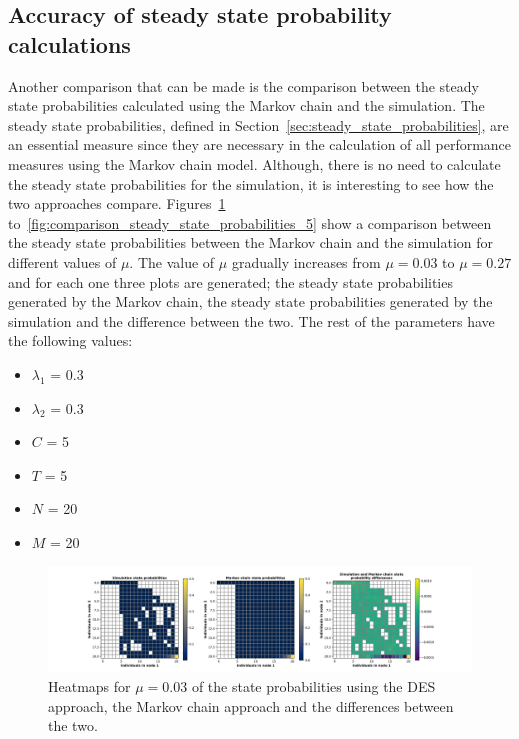 \subsection{Accuracy of steady state probability calculations}

Another comparison that can be made is the comparison between the steady state
probabilities calculated using the Markov chain and the simulation.
The steady state probabilities, defined in
Section~\ref{sec:steady_state_probabilities}, are an essential measure since
they are necessary in the calculation of all performance measures using the
Markov chain model.
Although, there is no need to calculate the steady state probabilities for the
simulation, it is interesting to see how the two approaches compare.
Figures~\ref{fig:comparison_steady_state_probabilities_1}
to~\ref{fig:comparison_steady_state_probabilities_5} show a comparison between
the steady state probabilities between the Markov chain and the simulation
for different values of \(\mu\).
The value of \(\mu\) gradually increases from \(\mu = 0.03\) to \(\mu = 0.27\)
and for each one three plots are generated; the steady state probabilities
generated by the Markov chain, the steady state probabilities generated by the
simulation and the difference between the two.
The rest of the parameters have the following values:

\begin{multicols}{2}
    \begin{itemize}
        \item \(\lambda_1\) = 0.3
        \item \(\lambda_2\) = 0.3
        \item \(C\) = 5
        \item \(T\) = 5
        \item \(N\) = 20
        \item \(M\) = 20
    \end{itemize}
\end{multicols}


\begin{figure}[H]
    \includegraphics[width=\textwidth, trim=100 10 100 10, clip]{chapters/03_queueing_model/img/numeric_results_and_timings/steady_state_probabilities/main_1.pdf}
    \caption{Heatmaps for \(\mu = 0.03\) of the state probabilities using the
    DES approach, the Markov chain approach and the differences between the
    two.}
    \label{fig:comparison_steady_state_probabilities_1}
\end{figure}

